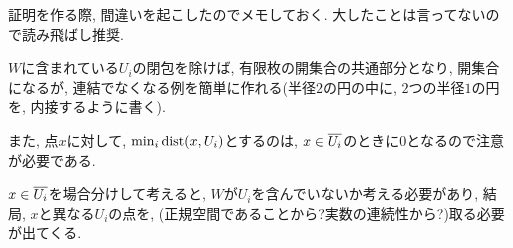\documentclass[../main]{subfiles}
\begin{document}
証明を作る際, 間違いを起こしたのでメモしておく.
大したことは言ってないので読み飛ばし推奨.
\begin{memo*}
  $W$に含まれている$U_i$の閉包を除けば, 有限枚の開集合の共通部分となり, 開集合になるが,
  連結でなくなる例を簡単に作れる(半径$2$の円の中に, $2$つの半径$1$の円を, 内接するように書く).

  また, 点$x$に対して, $\min_i \mathrm{dist}(x,U_i)$とするのは,
  $x\in{\overline{U_i}}$のときに$0$となるので注意が必要である.

  $x\in{\overline{U_i}}$を場合分けして考えると,
  $W$が$U_i$を含んでいないか考える必要があり,
  結局, $x$と異なる$U_i$の点を,
  (正規空間であることから?実数の連続性から?)取る必要が出てくる.
\end{memo*}
\end{document}
